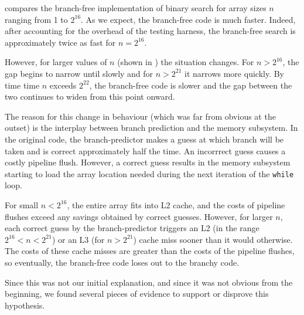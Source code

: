 \documentclass{patmorin}
\begin{document}
 compares the branch-free implementation
of binary search for array sizes $n$ ranging from 1 to $2^{16}$.  As we
expect, the branch-free code is much faster. Indeed, after accounting
for the overhead of the testing harness, the branch-free search is
approximately twice as fast for $n=2^{16}$.

However, for larger values of $n$ (shown in )
the situation changes.  For $n>2^{16}$, the gap begins to narrow until
slowly and for $n>2^{21}$ it narrows more quickly.  By time time $n$
exceeds $2^{22}$, the branch-free code is slower and the gap between
the two continues to widen from this point onward.

The reason for this change in behaviour (which was far from obvious at
the outset) is the interplay between branch prediction and the memory
subsystem.  In the original code, the branch-predictor makes a guess at
which branch will be taken and is correct approximately half the time. An
incorrrect guess causes a costly pipeline flush.  However, a correct
guess results in the memory subsystem starting to load the array location
needed during the next iteration of the \texttt{while} loop.

For small $n<2^{16}$, the entire array fits into L2 cache, and the costs
of pipeline flushes exceed any savings obtained by correct guesses.
However, for larger $n$, each correct guess by the branch-predictor
triggers an L2 (in the range $2^{16}<n<2^{21}$) or an L3 (for $n>2^{21}$)
cache miss sooner than it would otherwise.  The costs of these cache
misses are greater than the costs of the pipeline flushes, so eventually,
the branch-free code loses out to the branchy code.

Since this was not our initial explanation, and since it was not obvious from
the beginning, we found several pieces of evidence to support or disprove this hypothesis.
\end{document}
